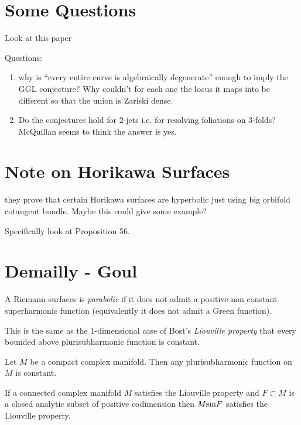\documentclass[12pt]{article}
\begin{document}
\section{Some Questions}

Look at this paper 

Questions:
\begin{enumerate}
\item why is ``every entire curve is algebraically degenerate'' enough to imply the GGL conjecture? Why couldn't for each one the locus it maps into be different so that the union is Zariski dense. 
\item Do the conjectures hold for $2$-jets i.e. for resolving foliations on $3$-folds? McQuillan seems to think the answer is yes. 
\end{enumerate}

\section{Note on Horikawa Surfaces}

 they prove that certain Horikawa surfaces are hyperbolic just using big orbifold cotangent bundle. Maybe this could give some example?

Specifically look at Proposition 56.


\section{Demailly - Goul}

\begin{defn}
A Riemann surfaces is \textit{parabolic} if it does not admit a positive non constant superharmonic function (equivalently it does not admit a Green function). 
\end{defn}

\begin{rmk}
This is the same as the $1$-dimensional case of Bost's \textit{Liouville property} that every bounded above plurisubharmonic function is constant.
\end{rmk}

\begin{theorem}[Liouville]
Let $M$ be a compact complex manifold. Then any plurisubharmonic function on $M$ is constant. 
\end{theorem}

\begin{theorem}
If a connected complex manifold $M$ satisfies the Liouville property and $F \subset M$ is a closed analytic subset of positive codimension then $M \mathrm{sm} F$ satisfies the Liouville property.
\end{theorem}
\end{document}
